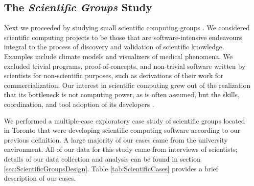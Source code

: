\subsection{The \emph{Scientific Groups} Study}
\label{sec:ScientificGroupsStudy}

Next we proceeded by studying small scientific computing groups \cite{Aranda2008b}. We considered scientific computing projects to be those that are software-intensive endeavours integral to the process of discovery and validation of scientific knowledge. Examples include climate models and visualizers of medical phenomena. We excluded trivial programs, proof-of-concepts, and non-trivial software written by scientists for non-scientific purposes, such as derivations of their work for commercialization. Our interest in scientific computing grew out of the realization that its bottleneck is not computing power, as is often assumed, but the skills, coordination, and tool adoption of its developers \cite{Wilson2006}.

We performed a multiple-case exploratory case study of scientific groups located in Toronto that were developing scientific computing software according to our previous definition. A large majority of our cases came from the university environment. All of our data for this study came from interviews of scientists; details of our data collection and analysis can be found in section \ref{sec:ScientificGroupsDesign}. Table \ref{tab:ScientificCases} provides a brief description of our cases.

